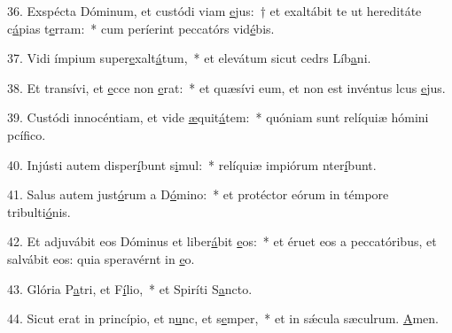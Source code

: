 36. Exspécta Dóminum, et custódi viam \uline{e}jus:~† et exaltábit te ut hereditáte c\uline{á}pias t\uline{e}rram:~* cum períerint peccatórs vid\uline{é}bis.\par 
37. Vidi ímpium super\uline{e}xalt\uline{á}tum,~* et elevátum sicut cedrs Líb\uline{a}ni.\par 
38. Et transívi, et \uline{e}cce non \uline{e}rat:~* et quæsívi eum, et non est invéntus lcus \uline{e}jus.\par 
39. Custódi innocéntiam, et vide \uline{æ}quit\uline{á}tem:~* quóniam sunt relíquiæ hómini pcíf\uline{i}co.\par 
40. Injústi autem disper\uline{í}bunt s\uline{i}mul:~* relíquiæ impiórum nter\uline{í}bunt.\par 
41. Salus autem just\uline{ó}rum a D\uline{ó}mino:~* et protéctor eórum in témpore tribulti\uline{ó}nis.\par 
42. Et adjuvábit eos Dóminus et liber\uline{á}bit \uline{e}os:~* et éruet eos a peccatóribus, et salvábit eos: quia speravérnt in \uline{e}o.\par 
43. Glória P\uline{a}tri, et F\uline{í}lio,~* et Spiríti S\uline{a}ncto.\par 
44. Sicut erat in princípio, et n\uline{u}nc, et s\uline{e}mper,~* et in sǽcula sæculrum. \uline{A}men.\par 
